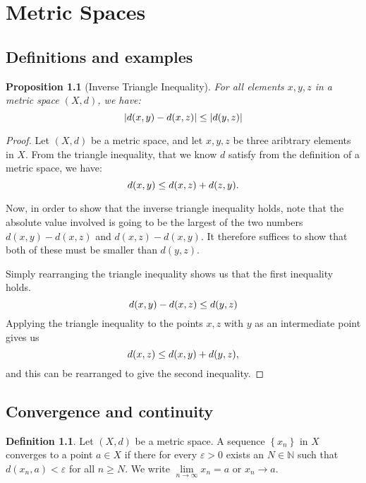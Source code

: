 \documentclass[a4paper]{report}
\newtheorem{prp}{Proposition}
\theoremstyle{definition}
\newtheorem{defn}{Definition}
\begin{document}
\chapter{Metric Spaces}
\section{Definitions and examples}

\begin{prp}[Inverse Triangle Inequality]
  For all elements $x, y, z$ in a metric space $\left(X, d\right)$, we have:
  \begin{equation}
    \notag
    |d(x, y) - d(x, z)| \leq |d(y, z)|
  \end{equation}
\end{prp}

\begin{proof}
  Let $(X, d)$ be a metric space, and let $x, y, z$ be three aribtrary elements
  in $X$.  From the triangle inequality, that we know $d$ satisfy from the
  definition of a metric space, we have:
  \begin{equation}
    \notag
    d(x, y) \leq d(x, z) + d(z, y).
  \end{equation}

  Now, in order to show that the inverse triangle inequality holds, note that
  the absolute value involved is going to be the largest of the two numbers
  $d(x, y) - d(x, z)$ and $d(x, z) - d(x, y)$. It therefore suffices to show
  that both of these must be smaller than $d(y, z)$. 

  Simply rearranging the triangle inequality shows us that the first inequality
  holds.
  \begin{equation}
    \notag
    d(x, y) - d(x, z) \leq d(y, z)
  \end{equation}
  Applying the triangle inequality to the points $x, z$ with $y$ as an
  intermediate point gives us
  \begin{equation}
    \notag
    d(x, z) \leq d(x, y) + d(y, z),
  \end{equation}
  and this can be rearranged to give the second inequality.
\end{proof}

\section{Convergence and continuity}
\begin{defn}
  Let $(X, d)$ be a metric space. A sequence $\left\{ x_n \right\}$ in $X$
  converges to a point $a \in X$ if there for every $\varepsilon > 0$ exists an
  $N \in \mathbb{N}$ such that $d(x_{n}, a) < \varepsilon$ for all $n \geq N$.
  We write $\lim\limits_{n\rightarrow \infty} x_n = a$ or $x_{n} \rightarrow a$.
\end{defn}
\end{document}
